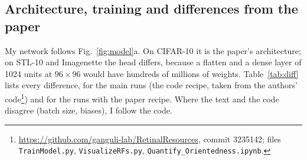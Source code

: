 \documentclass[11pt,a4paper]{article}
\begin{document}
\subsection{Architecture, training and differences from the paper}
My network follows Fig.~\ref{fig:model}a. On CIFAR-10 it is the paper's architecture; on STL-10 and Imagenette the head differs, because a flatten and a dense layer of 1024 units at $96{\times}96$ would have hundreds of millions of weights. Table~\ref{tab:diff} lists every difference, for the main runs (the code recipe, taken from the authors' code\footnote{\url{https://github.com/ganguli-lab/RetinalResources}, commit 3235142; files \texttt{TrainModel.py}, \texttt{VisualizeRFs.py}, \texttt{Quantify\_Orientedness.ipynb}.}) and for the runs with the paper recipe. Where the text and the code disagree (batch size, biases), I follow the code.
\end{document}
